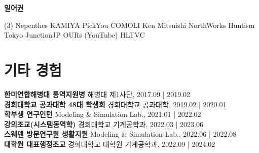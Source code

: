 \documentclass[a4paper,10pt]{extarticle}
\begin{document}
\noindent
{\large\textbf{일어권}}
\begin{tasks}[style=itemize](3)
    \task Nepenthes
    \task KAMIYA
    \task PickYou
    \task COMOLI
    \task Ken Mitsuishi
    \task NorthWorks
    \task Huntism Tokyo
    \task JunctionJP
    \task OURs (YouTube)
    \task HLTVC
\end{tasks}




\section*{기타 경험}
\textbf{한미연합해병대 통역지원병} \hfill 해병대 제1사단, 2017.09 | 2019.02\\
\textbf{경희대학교 공과대학 48대 학생회} \hfill 경희대학교 공과대학, 2019.02 | 2020.01\\
\textbf{학부생 연구인턴} \hfill Modeling \& Simulation Lab., 2021.01 | 2022.02\\
\textbf{강의조교(시스템동역학)} \hfill 경희대학교 기계공학과, 2022.03 | 2023.06\\
\textbf{스웨덴 방문연구원 생활지원} \hfill Modeling \& Simulation Lab., 2022.06 | 2022.08\\
\textbf{대학원 대표행정조교} \hfill 경희대학교 대학원 기계공학과, 2022.09 | 2024.02\\
\end{document}
